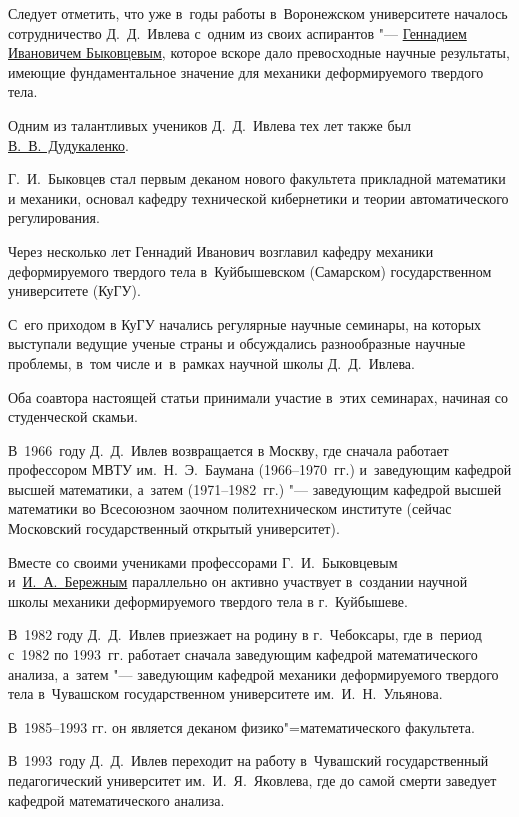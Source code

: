 Следует отметить, что уже в~годы работы в~Воронежском университете началось сотрудничество Д.~Д.~Ивлева с~одним из своих аспирантов "--- \href{https://goo.gl/WzRPuR}{Геннадием Ивановичем Быковцевым}, которое вскоре дало превосходные научные результаты, имеющие фундаментальное значение для механики деформируемого твердого тела. 

Одним из талантливых учеников Д.~Д.~Ивлева тех лет также был \href{https://zbmath.org/authors/?q=ai:dudukalenko.v-v}{В.~В.~Дудукаленко}. 

Г.~И.~Быковцев стал первым деканом нового факультета прикладной математики и механики, основал кафедру технической кибернетики и теории автоматического регулирования. 

Через несколько лет Геннадий Иванович возглавил кафедру механики деформируемого твердого тела в~Куйбышевском (Самарском) государственном университете (КуГУ). 

С~его приходом в КуГУ начались регулярные научные семинары, на которых выступали ведущие ученые страны и обсуждались разнообразные научные проблемы, в~том числе и~в~рамках научной школы Д.~Д.~Ивлева. 

Оба соавтора настоящей статьи принимали участие в~этих семинарах, начиная со студенческой скамьи.



В~1966~году Д.~Д.~Ивлев возвращается в Москву, где сначала работает профессором МВТУ им.~Н.~Э.~Баумана (1966–1970~гг.) и~заведующим кафедрой высшей математики, а~затем (1971–1982~гг.) "--- заведующим кафедрой высшей математики во Всесоюзном заочном политехническом институте (сейчас Московский государственный открытый университет). 

Вместе со своими учениками профессорами Г.~И.~Быковцевым и~\href{https://goo.gl/bRpVD6}{И.~А.~Бережным} параллельно он активно участвует в~создании научной школы механики деформируемого твердого тела в г.~Куйбышеве.



В~1982 году Д.~Д.~Ивлев приезжает на родину в г.~Чебоксары, где в~период с~1982 по 1993~гг. работает сначала заведующим кафедрой математического анализа, а~затем "--- заведующим кафедрой механики деформируемого твердого тела в~Чувашском государственном университете им.~И.~Н.~Ульянова. 

В~1985–1993 гг. он является деканом физико"=математического факультета. 

В~1993~году Д.~Д.~Ивлев переходит на работу в~Чувашский государственный педагогический университет им.~И.~Я.~Яковлева, где до самой смерти заведует кафедрой математического анализа. 

